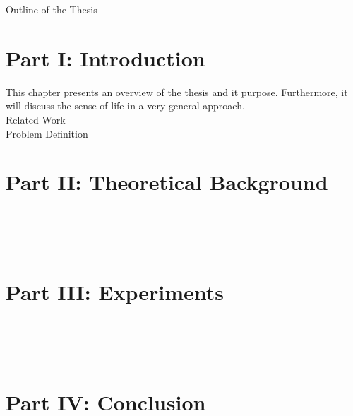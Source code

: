 \clearemptydoublepage

{}

\begin{center}
    \huge{Outline of the Thesis}
\end{center}

\section*{Part I: Introduction}

  \vspace{1mm}
\noindent  This chapter presents an overview of the thesis and it purpose. Furthermore, it will discuss the sense of life in a very general approach. \\

  \vspace{1mm}
\noindent Related Work \\

  \vspace{1mm}
\noindent Problem Definition \\

\section*{Part II: Theoretical Background}

  \vspace{1mm} \\

  \vspace{1mm} \\

  \vspace{1mm} \\

\section*{Part III: Experiments}
  \vspace{1mm} \\

  \vspace{1mm} \\

  \vspace{1mm} \\

\section*{Part IV: Conclusion}
  \vspace{1mm} \\
